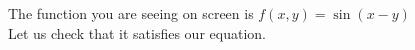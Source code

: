 \documentclass[preview]{standalone}
\begin{document}
\begin{center}
The function you are seeing on screen is $f(x, y)$$=$$\sin(x - y)$\\Let us check that it satisfies our equation.
\end{center}
\end{document}
